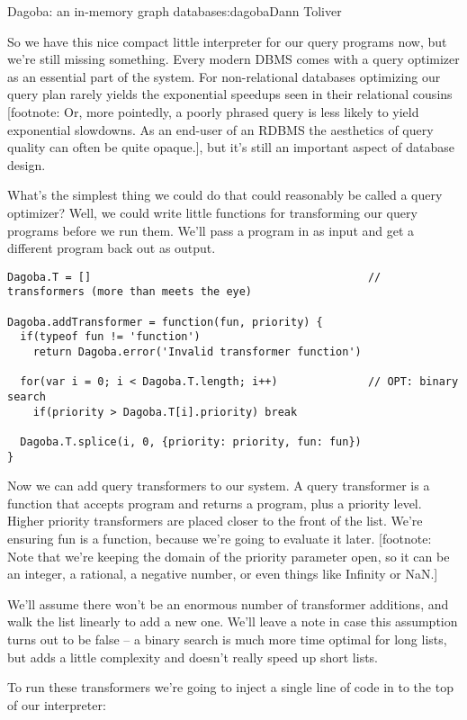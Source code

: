 \begin{aosachapter}{Dagoba: an in-memory graph database}{s:dagoba}{Dann Toliver}
\label{query-transformers}

So we have this nice compact little interpreter for our query programs
now, but we're still missing something. Every modern DBMS comes with a
query optimizer as an essential part of the system. For non-relational
databases optimizing our query plan rarely yields the exponential
speedups seen in their relational cousins {[}footnote: Or, more
pointedly, a poorly phrased query is less likely to yield exponential
slowdowns. As an end-user of an RDBMS the aesthetics of query quality
can often be quite opaque.{]}, but it's still an important aspect of
database design.

What's the simplest thing we could do that could reasonably be called a
query optimizer? Well, we could write little functions for transforming
our query programs before we run them. We'll pass a program in as input
and get a different program back out as output.

\begin{verbatim}
Dagoba.T = []                                           // transformers (more than meets the eye)

Dagoba.addTransformer = function(fun, priority) {
  if(typeof fun != 'function')
    return Dagoba.error('Invalid transformer function') 
  
  for(var i = 0; i < Dagoba.T.length; i++)              // OPT: binary search
    if(priority > Dagoba.T[i].priority) break
  
  Dagoba.T.splice(i, 0, {priority: priority, fun: fun})
}
\end{verbatim}

Now we can add query transformers to our system. A query transformer is
a function that accepts program and returns a program, plus a priority
level. Higher priority transformers are placed closer to the front of
the list. We're ensuring fun is a function, because we're going to
evaluate it later. {[}footnote: Note that we're keeping the domain of
the priority parameter open, so it can be an integer, a rational, a
negative number, or even things like Infinity or NaN.{]}

We'll assume there won't be an enormous number of transformer additions,
and walk the list linearly to add a new one. We'll leave a note in case
this assumption turns out to be false -- a binary search is much more
time optimal for long lists, but adds a little complexity and doesn't
really speed up short lists.

To run these transformers we're going to inject a single line of code in
to the top of our interpreter:


\end{aosachapter}
